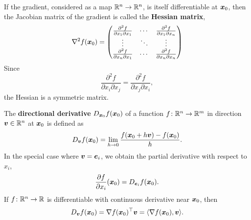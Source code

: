  If the gradient, considered as a map $\mathbb{R}^n\to \mathbb{R}^n$, is itself differentiable at $\bm{x}_0$, then the Jacobian matrix of the gradient is called the \textbf{Hessian matrix}, 
\begin{equation*}
 \nabla^2f(\bm{x}_0) = \begin{pmatrix}
                         \frac{\partial^2f}{\partial x_1\partial x_1} & \cdots & \frac{\partial^2f}{\partial x_1\partial x_n}\\
                         \vdots & \ddots & \vdots\\
                         \frac{\partial^2f}{\partial x_n\partial x_1} & \cdots & \frac{\partial^2f}{\partial x_n\partial x_n}
                        \end{pmatrix}
\end{equation*}
Since
\begin{equation*}
 \frac{\partial^2f}{\partial x_i\partial x_j} = \frac{\partial^2f}{\partial x_j\partial x_i}, 
\end{equation*}
the Hessian is a symmetric matrix.

The \textbf{directional derivative} $D_{\bm{x}_0}f(\bm{x}_0)$ of a function $f\colon \mathbb{R}^n\to \mathbb{R}^m$ in direction $\bm{v}\in \mathbb{R}^n$ at $\bm{x}_0$ is defined as
\begin{equation*}
 D_{\bm{v}}f(\bm{x}_0) = \lim_{h\to 0}\frac{f(\bm{x}_0+h\bm{v})-f(\bm{x}_0)}{h}.
\end{equation*}
In the special case where $\bm{v}=\bm{e}_i$, we obtain the partial derivative with respect to $x_i$,
\begin{equation*}
 \frac{\partial f}{\partial x_i}(\bm{x}_0) = D_{\bm{e}_i}f(\bm{x}_0).
\end{equation*}
If $f\colon \mathbb{R}^n\to \mathbb{R}$ is differentiable with continuous derivative near $\bm{x}_0$, then
\begin{equation*}
 D_{\bm{v}}f(\bm{x}_0) = \nabla f(\bm{x}_0)^{\top}\bm{v} = \langle {\nabla f(\bm{x}_0)}, {\bm{v}} \rangle.
\end{equation*}

